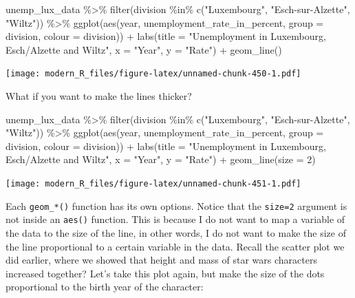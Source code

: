 \documentclass[
]{article}
\newenvironment{Shaded}{\begin{snugshade}}{\end{snugshade}}
\newcommand{\AttributeTok}[1]{\textcolor[rgb]{0.77,0.63,0.00}{#1}}
\newcommand{\DecValTok}[1]{\textcolor[rgb]{0.00,0.00,0.81}{#1}}
\newcommand{\FunctionTok}[1]{\textcolor[rgb]{0.00,0.00,0.00}{#1}}
\newcommand{\NormalTok}[1]{#1}
\newcommand{\SpecialCharTok}[1]{\textcolor[rgb]{0.00,0.00,0.00}{#1}}
\newcommand{\StringTok}[1]{\textcolor[rgb]{0.31,0.60,0.02}{#1}}
\begin{document}
\begin{Shaded}
\begin{Highlighting}[]
\NormalTok{unemp\_lux\_data }\SpecialCharTok{\%\textgreater{}\%}
  \FunctionTok{filter}\NormalTok{(division }\SpecialCharTok{\%in\%} \FunctionTok{c}\NormalTok{(}\StringTok{"Luxembourg"}\NormalTok{, }\StringTok{"Esch{-}sur{-}Alzette"}\NormalTok{, }\StringTok{"Wiltz"}\NormalTok{)) }\SpecialCharTok{\%\textgreater{}\%}
  \FunctionTok{ggplot}\NormalTok{(}\FunctionTok{aes}\NormalTok{(year, unemployment\_rate\_in\_percent, }\AttributeTok{group =}\NormalTok{ division, }\AttributeTok{colour =}\NormalTok{ division)) }\SpecialCharTok{+}
  \FunctionTok{labs}\NormalTok{(}\AttributeTok{title =} \StringTok{"Unemployment in Luxembourg, Esch/Alzette and Wiltz"}\NormalTok{, }\AttributeTok{x =} \StringTok{"Year"}\NormalTok{, }\AttributeTok{y =} \StringTok{"Rate"}\NormalTok{) }\SpecialCharTok{+}
  \FunctionTok{geom\_line}\NormalTok{()}
\end{Highlighting}
\end{Shaded}

\texttt{[image: modern\_R\_files/figure-latex/unnamed-chunk-450-1.pdf]}

What if you want to make the lines thicker?

\begin{Shaded}
\begin{Highlighting}[]
\NormalTok{unemp\_lux\_data }\SpecialCharTok{\%\textgreater{}\%}
  \FunctionTok{filter}\NormalTok{(division }\SpecialCharTok{\%in\%} \FunctionTok{c}\NormalTok{(}\StringTok{"Luxembourg"}\NormalTok{, }\StringTok{"Esch{-}sur{-}Alzette"}\NormalTok{, }\StringTok{"Wiltz"}\NormalTok{)) }\SpecialCharTok{\%\textgreater{}\%}
  \FunctionTok{ggplot}\NormalTok{(}\FunctionTok{aes}\NormalTok{(year, unemployment\_rate\_in\_percent, }\AttributeTok{group =}\NormalTok{ division, }\AttributeTok{colour =}\NormalTok{ division)) }\SpecialCharTok{+}
  \FunctionTok{labs}\NormalTok{(}\AttributeTok{title =} \StringTok{"Unemployment in Luxembourg, Esch/Alzette and Wiltz"}\NormalTok{, }\AttributeTok{x =} \StringTok{"Year"}\NormalTok{, }\AttributeTok{y =} \StringTok{"Rate"}\NormalTok{) }\SpecialCharTok{+}
  \FunctionTok{geom\_line}\NormalTok{(}\AttributeTok{size =} \DecValTok{2}\NormalTok{)}
\end{Highlighting}
\end{Shaded}

\texttt{[image: modern\_R\_files/figure-latex/unnamed-chunk-451-1.pdf]}

Each \texttt{geom\_*()} function has its own options. Notice that the \texttt{size=2} argument is not inside
an \texttt{aes()} function. This is because I do not want to map a variable of the data to the size
of the line, in other words, I do not want to make the size of the line proportional to a certain
variable in the data. Recall the scatter plot we did earlier, where we showed that height and mass of
star wars characters increased together? Let's take this plot again, but make the size of the dots proportional
to the birth year of the character:
\end{document}
